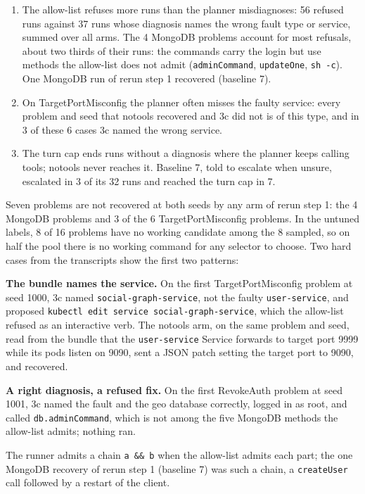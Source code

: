 \documentclass[10pt,conference]{IEEEtran}
\newcommand{\code}[1]{\texttt{\upshape #1}}
\begin{document}
\begin{enumerate}
\item The allow-list refuses more runs than the planner misdiagnoses: 56 refused runs
against 37 runs whose diagnosis names the wrong fault type or service, summed over all arms. The 4
MongoDB problems account for most refusals, about two thirds of their runs: the commands carry the login but use methods the allow-list does not admit
(\code{adminCommand}, \code{updateOne}, \code{sh -c}). One MongoDB run of rerun step 1 recovered
(baseline 7).
\item On TargetPortMisconfig the planner often misses the faulty service: every problem and seed
that notools recovered and 3c did not is of this type, and in 3 of these 6 cases 3c named the wrong
service.
\item The turn cap ends runs without a diagnosis where the planner keeps calling tools;
notools never reaches it. Baseline 7, told to escalate when unsure, escalated in 3 of its 32 runs
and reached the turn cap in 7.
\end{enumerate}

\noindent Seven problems are not recovered at both seeds by any arm of rerun step 1: the 4 MongoDB
problems and 3 of the 6 TargetPortMisconfig problems. In the untuned labels, 8 of 16 problems have no working
candidate among the 8 sampled, so on half the pool there is no working command for any selector to
choose. Two hard cases from the transcripts show the first two patterns:

{\raggedright

\textbf{The bundle names the service.} On the first TargetPortMisconfig problem at seed 1000, 3c
named \code{social-graph-service}, not the faulty \code{user-service}, and proposed
\code{kubectl edit service social-graph-service}, which the allow-list refused as an interactive
verb. The notools arm, on the same problem and seed, read from the bundle that the
\code{user-service} Service forwards to target port 9999 while its pods listen on 9090, sent a
JSON patch setting the target port to 9090, and recovered.

\textbf{A right diagnosis, a refused fix.} On the first RevokeAuth problem at seed 1001, 3c named
the fault and the geo database correctly, logged in as root, and called \code{db.adminCommand},
which is not among the five MongoDB methods the allow-list admits; nothing ran.\par}

\noindent The runner admits a chain \code{a \&\& b} when the allow-list admits each part; the one
MongoDB recovery of rerun step 1 (baseline 7) was such a chain, a \code{createUser} call followed by a restart of
the client.
\end{document}
